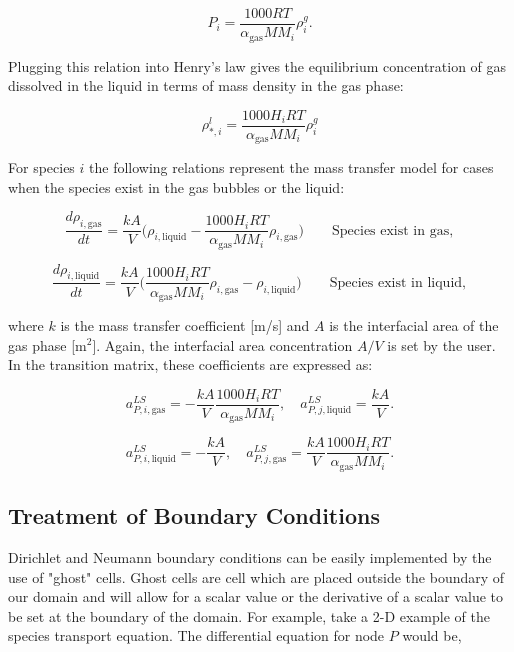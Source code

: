 \begin{equation}
    P_{i} = \frac{1000RT}{\alpha_{\text{gas}}MM_{i}}\rho_{i}^{g}. 
\end{equation}

\noindent Plugging this relation into Henry's law gives the equilibrium concentration of gas dissolved in the liquid in terms of mass density in the gas phase:

\begin{equation}
    \rho_{*,i}^{l} = \frac{1000H_{i}RT}{\alpha_{\text{gas}}MM_{i}}\rho_{i}^{g}
\end{equation}

\noindent For species $i$ the following relations represent the mass transfer model for cases when the species exist in the gas bubbles or the liquid:

\begin{equation}
    \frac{d\rho_{i, \text{gas}}}{dt} = \frac{kA}{V}\bigg(\rho_{i,\text{liquid}} - \frac{1000H_{i}RT}{\alpha_{\text{gas}}MM_{i}}\rho_{i, \text{gas}}\bigg) \quad \quad \text{Species exist in gas},
\end{equation}

\begin{equation}
    \frac{d\rho_{i, \text{liquid}}}{dt} = \frac{kA}{V}\bigg(\frac{1000H_{i}RT}{\alpha_{\text{gas}}MM_{i}}\rho_{i, \text{gas}} - \rho_{i,\text{liquid}}\bigg) \quad \quad \text{Species exist in liquid},
\end{equation}

\noindent where $k$ is the mass transfer coefficient [m/s] and $A$ is the interfacial area of the gas phase [m$^2$]. Again, the interfacial area concentration $A/V$ is set by the user. In the transition matrix, these coefficients are expressed as:

\begin{equation}
    a^{LS}_{P,i, \text{gas}} = -\frac{kA}{V}\frac{1000H_{i}RT}{\alpha_{\text{gas}}MM_{i}}, \quad 
    a^{LS}_{P,j, \text{liquid}} = \frac{kA}{V}.
\end{equation}

\begin{equation}
    a^{LS}_{P,i, \text{liquid}} = -\frac{kA}{V}, \quad 
    a^{LS}_{P,j, \text{gas}} = \frac{kA}{V}\frac{1000H_{i}RT}{\alpha_{\text{gas}}MM_{i}}.
\end{equation}

\subsection{Treatment of Boundary Conditions}
Dirichlet and Neumann boundary conditions can be easily implemented by the use of "ghost" cells. Ghost cells are cell which are placed outside the boundary of our domain and will allow for a scalar value or the derivative of a scalar value to be set at the boundary of the domain. For example, take a 2-D example of the species transport equation. The differential equation for node $P$ would be,

